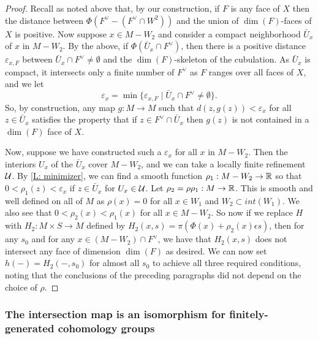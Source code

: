 \begin{proof}
Recall as noted above that, by our construction, if $F$ is any face of $X$ then the distance between $\Phi(F^\vee-(F^\vee \cap W^2))$ and the union of $\dim(F)$-faces of $X$ is positive.
Now suppose $x\in M-W_2$ and consider a compact neighborhood $\bar U_x$ of $x$ in $M-W_2$. By the above, if $\Phi(\bar U_x\cap F^\vee)$, then there is a positive distance $\varepsilon_{x,F}$ between $\bar U_x\cap F^\vee\neq \emptyset$ and the $\dim(F)$-skeleton of the cubulation. As $\bar U_x$ is compact, it intersects only a finite number of $F^\vee$ as $F$ ranges over all faces of $X$, and we let $$\varepsilon_x=\min\{\varepsilon_{x,F}\mid \bar U_x\cap F^\vee\neq \emptyset\}.$$
So, by construction, any map $g:M\to M$ such that $d(z,g(z))<\varepsilon_x$ for all $z\in \bar U_x$ satisfies the property that if $z\in F^\vee \cap \bar U_x$ then $g(z)$ is not contained in a $\dim(F)$ face of $X$.



Now, suppose we have constructed such a $\varepsilon_x$ for all $x$ in $M-W_2$. Then the interiors $U_x$ of the $\bar U_x$ cover $M-W_2$, and  we can take a locally finite refinement $\mathcal{U}$.  By \cref{L: minimizer}, we can find a smooth function $\rho_1:M-W_2\to \mathbb{R}$ so that $0<\rho_1(z)<\varepsilon_x$ if $z\in \bar U_x$ for $U_x\in \mathcal{U}$. Let $\rho_2=\rho\rho_1:M\to \mathbb{R}$. This is smooth and well defined on all of $M$ as $\rho(x)=0$ for all $x\in W_1$ and $W_2\subset int(W_1)$. We also see that $0<\rho_2(x)<\rho_1(x)$ for all $x\in M-W_2$. So now if we replace $H$ with $H_2:M\times S\to M$ defined by  $H_2(x,s)=\pi(\Phi(x)+\rho_2(x)\epsilon s)$, then for any $s_0$ and for any $x\in (M-W_2)\cap F^\vee$, we have that  $H_2(x,s)$ does not intersect any face of dimension $\dim(F)$ as desired. We can now set $h(-)=H_2(-,s_0)$ for almost all $s_0$ to achieve all three required conditions, noting that the conclusions of the preceding paragraphs did not depend on the choice of $\rho$.
\end{proof}


\subsubsection{The intersection map is an isomorphism for finitely-generated cohomology groups}

